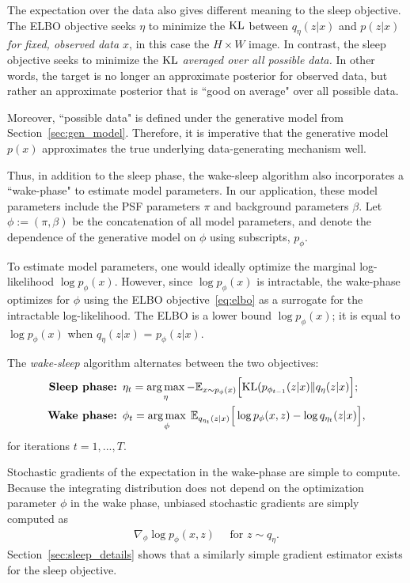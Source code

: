The expectation over the data also gives different meaning to the sleep objective. The ELBO objective seeks $\eta$ to minimize the $\textrm{KL}$ between $q_\eta(z | x)$ and $p(z | x)$ {\itshape for fixed, observed data $x$},
in this case the $H\times W$ image. In contrast, the sleep objective seeks to minimize the $\textrm{KL}$ {\itshape averaged over all possible data. } In other words, the target is no longer an approximate posterior for observed data, but rather an approximate posterior that is ``good on average" over all possible data.

Moreover, ``possible data" is defined under the generative model from Section~\ref{sec:gen_model}. Therefore, it is imperative that the generative model $p(x)$ approximates the true underlying data-generating mechanism well. 

Thus, in addition to the sleep phase, the wake-sleep algorithm also incorporates a ``wake-phase" to estimate model parameters.
In our application, these model parameters include the PSF parameters $\pi$ and background parameters $\beta$. Let 
$\phi:=(\pi, \beta)$ be the concatenation of all model parameters, and denote the dependence of the generative model on $\phi$ using subscripts, $p_\phi$. 

To estimate model parameters, one would ideally optimize the marginal log-likelihood $\log p_\phi(x)$.
However, since $\log p_\phi(x)$ is intractable, the wake-phase optimizes for $\phi$ using the ELBO objective~\eqref{eq:elbo}
as a surrogate for the intractable log-likelihood. 
The ELBO is a lower bound
$\log p_\phi(x)$; it is equal to $\log p_\phi(x)$ when $q_\eta(z | x)$ 
= $p_\phi(z | x)$. 

The {\itshape wake-sleep} algorithm alternates between the two objectives: 
\begin{align}
    \text{{\bf Sleep phase: }} & 
    \eta_{t} = \operatorname*{arg\,max}_{\eta} -\mathbb{E}_{x \sim p_\phi(x)}\Big[\textrm{KL}(p_{\phi_{t-1}}(z | x) \| q_\eta(z | x)\Big]
    \label{eq:sleep_phase_summary}; 
    \\
    \text{{\bf Wake phase: }} & \phi_{t} = \operatorname*{arg\,max}_{\phi}\; \mathbb{E}_{q_{\eta_t}(z | x)}\Big[\log p_{\phi}(x, z) - \log q_{\eta_t}(z | x)\Big],
    \label{eq:wake_phase_summary}
\end{align} 
for iterations $t = 1, ..., T$. 

Stochastic gradients of the expectation in the wake-phase are simple to compute. Because the integrating distribution does not depend on the optimization parameter $\phi$ in the wake phase, unbiased stochastic gradients are simply computed as 
\begin{align}
    \nabla_\phi \log p_\phi(x, z) \quad \text{ for } z\sim q_\eta. 
    \label{eq:mstep_grad}
\end{align}
Section~\ref{sec:sleep_details} shows that a similarly simple gradient estimator exists for the sleep objective.


